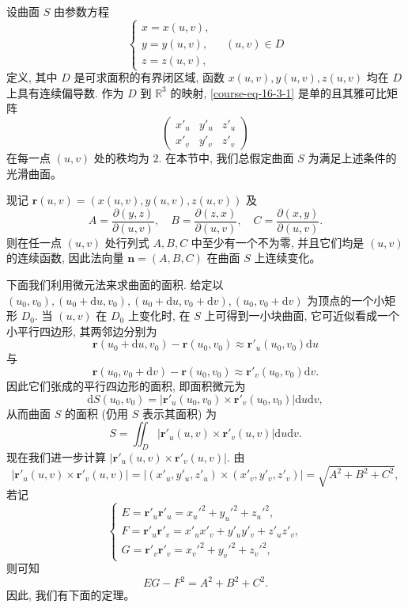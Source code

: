 \documentclass[UTF8,12pt,a4paper,fontset=fandol]{ctexart}
\begin{document}
设曲面 $S$ 由参数方程
\begin{equation}
  \begin{cases}
    x=x(u,v),\\
    y=y(u,v),\\
    z=z(u,v),
  \end{cases}
  \quad (u,v)\in D
  \label{course-eq-16-3-1}
\end{equation}
定义, 其中 $D$ 是可求面积的有界闭区域, 函数 $x(u,v),y(u,v),z(u,v)$ 均在 $D$ 上具有连续偏导数. 作为 $D$ 到 $\mathbb R^3$ 的映射, \eqref{course-eq-16-3-1}  是单的且其雅可比矩阵
\[
  \begin{pmatrix}
    x'_u & y'_u & z'_u\\
    x'_v & y'_v & z'_v
  \end{pmatrix}
\]
在每一点 $(u,v)$ 处的秩均为 $2$. 在本节中, 我们总假定曲面 $S$ 为满足上述条件的光滑曲面。

现记 $\boldsymbol r(u,v)=(x(u,v),y(u,v),z(u,v))$ 及
\begin{equation}
  A=\frac{\partial(y,z)}{\partial(u,v)},\quad
  B=\frac{\partial(z,x)}{\partial(u,v)},\quad
  C=\frac{\partial(x,y)}{\partial(u,v)}.
  \label{course-eq-16-3-2}
\end{equation}
则在任一点 $(u,v)$ 处行列式 $A,B,C$ 中至少有一个不为零, 并且它们均是 $(u,v)$ 的连续函数, 因此法向量 $\boldsymbol n=(A,B,C)$ 在曲面 $S$ 上连续变化。

下面我们利用微元法来求曲面的面积. 给定以 $(u_0,v_0),(u_0+\mathrm du,v_0),(u_0+\mathrm du,v_0+\mathrm dv),(u_0,v_0+\mathrm dv)$ 为顶点的一个小矩形 $D_0$. 当 $(u,v)$ 在 $D_0$ 上变化时, 在 $S$ 上可得到一小块曲面, 它可近似看成一个小平行四边形, 其两邻边分别为
\[
  \boldsymbol r(u_0+\mathrm du,v_0)-\boldsymbol r(u_0,v_0)
  \approx \boldsymbol r'_u(u_0,v_0)\mathrm du
\]
与
\[
  \boldsymbol r(u_0,v_0+\mathrm dv)-\boldsymbol r(u_0,v_0)
  \approx \boldsymbol r'_v(u_0,v_0)\mathrm dv.
\]
因此它们张成的平行四边形的面积, 即面积微元为
\[
  \mathrm dS(u_0,v_0)=|\boldsymbol r'_u(u_0,v_0)\times\boldsymbol r'_v(u_0,v_0)|\mathrm du\mathrm dv,
\]
从而曲面 $S$ 的面积 (仍用 $S$ 表示其面积) 为
\[
  S=\iint_D |\boldsymbol r'_u(u,v)\times\boldsymbol r'_v(u,v)|\mathrm du\mathrm dv.
\]
现在我们进一步计算 $|\boldsymbol r'_u(u,v)\times\boldsymbol r'_v(u,v)|$. 由
\[
  |\boldsymbol r'_u(u,v)\times\boldsymbol r'_v(u,v)|
  =|(x'_u,y'_u,z'_u)\times(x'_v,y'_v,z'_v)|
  =\sqrt{A^2+B^2+C^2},
\]
若记
\begin{equation}
  \begin{cases}
    E=\boldsymbol r'_u\boldsymbol r'_u=x_u'^2+y_u'^2+z_u'^2,\\
    F=\boldsymbol r'_u\boldsymbol r'_v=x'_ux'_v+y'_uy'_v+z'_uz'_v,\\
    G=\boldsymbol r'_v\boldsymbol r'_v=x_v'^2+y_v'^2+z_v'^2,
  \end{cases}
  \label{course-eq-16-3-3}
\end{equation}
则可知
\[
  EG-F^2=A^2+B^2+C^2.
\]
因此, 我们有下面的定理。
\end{document}
